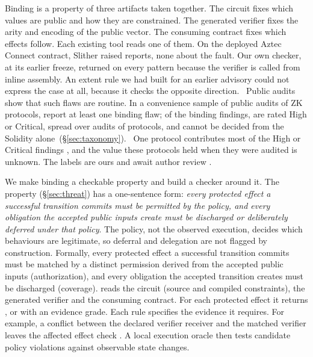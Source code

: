 Binding is a property of three artifacts taken together. The circuit fixes
which values are public and how they are constrained. The generated verifier
fixes the arity and encoding of the public vector. The consuming contract
fixes which effects follow. Each existing tool reads one of them. On the
deployed Aztec Connect contract, Slither raised \AztecSlitherReports{}
reports, none about the fault. Our own checker, at its earlier freeze,
returned \UNK{} on every pattern because the verifier is called from inline
assembly. An extent rule we had built for an earlier advisory could not
express the case at all, because it checks the opposite direction.%
\
Public audits show that such flaws are routine. In a convenience sample of
\RtwoAudits{} public audits of ZK protocols, \RtwoBindingAudits{} report at
least one binding flaw; of the \RtwoBindingFindings{} binding findings,
\RtwoHighCriticalBinding{} are rated High or Critical, spread over
\RtwoHighCriticalBindingAudits{} audits of
\RtwoHighCriticalBindingProtocols{} protocols, and
\RtwoBindingNeedsCircuitShare{} cannot be decided from the Solidity
alone~(\S\ref{sec:taxonomy}).%
\
One protocol contributes most of the High or Critical findings
, and the value these protocols held when they
were audited is unknown. The labels are ours and await author review
\TODO{R1b}.

We make binding a checkable property and build a checker around it. The
property (\S\ref{sec:threat}) has a one-sentence form: \emph{every protected
effect a successful transition commits must be permitted by the policy, and
every obligation the accepted public inputs create must be discharged or
deliberately deferred under that policy}. The policy, not the observed
execution, decides which behaviours are legitimate, so deferral and delegation
are not flagged by construction. Formally, every protected
effect a successful transition commits must be matched by a distinct
permission derived from the accepted public inputs (authorization), and every
obligation the accepted transition creates must be discharged (coverage).
\tool{} reads the circuit (source and compiled constraints), the generated
verifier and the consuming contract. For each protected effect it returns
\VIOL{}, \VWS{} or \UNK{} with an evidence grade. Each rule specifies the evidence it requires.
For example, a conflict between the declared verifier receiver and the matched
verifier leaves the affected effect check \UNK{}. A local execution oracle
then tests candidate policy violations against observable state changes.

